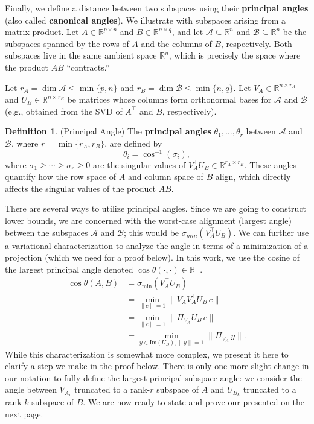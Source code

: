 \documentclass{article}
\newcommand{\prinangle}{\cos\theta}
\theoremstyle{plain}
\theoremstyle{definition}
\newtheorem{definition}[theorem]{Definition}
\theoremstyle{remark}
\begin{document}
Finally, we define a distance between two subspaces using their \textbf{principal angles} (also called \textbf{canonical angles}). We illustrate with subspaces arising from a matrix product. Let $A \in \mathbb{R}^{p \times n}$ and $B \in \mathbb{R}^{n \times q}$, and let $\mathcal{A} \subseteq \mathbb{R}^n$ and $\mathcal{B} \subseteq \mathbb{R}^n$ be the subspaces spanned by the rows of $A$ and the columns of $B$, respectively. Both subspaces live in the same ambient space $\mathbb{R}^n$, which is precisely the space where the product $AB$ ``contracts.''

Let $r_A = \dim \mathcal{A} \leq \min\{p, n\}$ and $r_B = \dim \mathcal{B} \leq \min\{n, q\}$. Let $V_A \in \mathbb{R}^{n \times r_A}$ and $U_B \in \mathbb{R}^{n \times r_B}$ be matrices whose columns form orthonormal bases for $\mathcal{A}$ and $\mathcal{B}$ (e.g., obtained from the SVD of $A^\top$ and $B$, respectively).

\begin{definition}{(Principal Angle)}
\label{def:principal_angle}
The \textbf{principal angles} $\theta_1, \ldots, \theta_r$ between $\mathcal{A}$ and $\mathcal{B}$, where $r = \min\{r_A, r_B\}$, are defined by
\[
\theta_i = \cos^{-1}(\sigma_i),
\]
where $\sigma_1 \geq \cdots \geq \sigma_r \geq 0$ are the singular values of $V_A^\top U_B \in \mathbb{R}^{r_A \times r_B}$. These angles quantify how the row space of $A$ and column space of $B$ align, which directly affects the singular values of the product $AB$.
\end{definition}

There are several ways to utilize principal angles. Since we are going to construct lower bounds, we are concerned with the worst-case alignment (largest angle) between the subspaces $\mathcal{A}$ and $\mathcal{B}$; this would be $\sigma_{min}(V_A^{\top}U_B)$. We can further use a variational characterization to analyze the angle in terms of a minimization of a projection (which we need for a proof below). In this work, we use the cosine of the largest principal angle denoted $\prinangle(\cdot, \cdot) \in \mathbb{R}_+$.
\begin{align*}
    \prinangle(A,B) &= \sigma_{\min}(V_A^{\top}U_B) \\
    &= \underset{\|c\| = 1}{\min}\|V_AV^{\top}_A U_{B}\,c\| \tag{Variational Definition} \\
    &= \underset{\|c\| = 1}{\min}\|\Pi_{V_A}U_{B}\,c\| \tag{Definition of Projection} \\
    &= \underset{y \in \mathrm{Im}(U_B), \|y\| = 1}{\min}\|\Pi_{V_A}\,y\|. \tag{Change of Variable} 
\end{align*} While this characterization is somewhat more complex, we present it here to clarify a step we make in the proof below. There is only one more slight change in our notation to fully define the largest principal subspace angle: we consider the angle between $V_{A_r}$ truncated to a rank-$r$ subspace of $A$ and $U_{B_k}$ truncated to a rank-$k$ subspace of $B$. We are now ready to state and prove our presented on the next page.  
\end{document}
